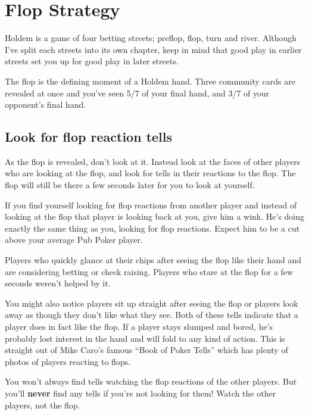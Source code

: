 \chapter{Flop Strategy}


Holdem is a game of four betting streets; preflop, flop, turn and river.
Although I've split each streets into its own chapter,
keep in mind that good play in earlier streets set you up for good
play in later streets.

The flop is the defining moment of a Holdem hand. Three community
cards are revealed at once and you've seen 5/7 of your final hand,
and 3/7 of your opponent's final hand.

\section{Look for flop reaction tells}

As the flop is revealed, don't look at it. Instead look
at the faces of other players who are looking
at the flop, and look for tells in their reactions to the flop.
The flop will still be there a few seconds later for you to look at
yourself.

If you find yourself looking for flop reactions from another player
and instead of looking at the flop that player is looking back at you,
give him a wink. He's doing exactly the same thing as you, looking for flop
reactions. Expect him to be a cut above your average Pub Poker player.

Players who quickly glance at their chips after seeing the flop
like their hand and are considering betting or check raising.
Players who stare at the flop for a few seconds weren't helped by it.

You might also notice players sit up straight after seeing the flop
or players look away as though they don't like what they see. Both
of these tells indicate that a player does in fact like the flop.
If a player stays slumped and bored, he's probably lost interest
in the hand and will fold to any kind of action. This is straight
out of Mike Caro's famous ``Book of Poker Tells'' which has plenty
of photos of players reacting to flops.


You won't always find tells watching the flop reactions of the other
players. But you'll \textbf{never} find any tells if you're not
looking for them! Watch the other players, not the flop.

